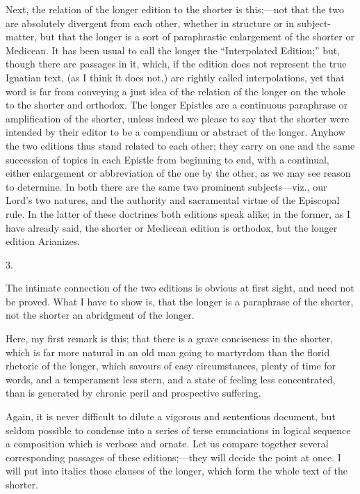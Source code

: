 Next, the relation of the
longer edition to the shorter is this;—not that the two are
absolutely divergent from each other, whether in structure or in
subject-matter, but that the longer is a sort of paraphrastic
enlargement of the shorter or Medicean. It has been usual to call the
longer the ``Interpolated Edition;'' but, though there are passages in
it, which, if the edition does not represent the true Ignatian text,
(as I think it does not,) are rightly called interpolations, yet that
word is far from conveying a just idea of the relation of the longer
on the whole to the shorter and orthodox. The longer Epistles
are a continuous paraphrase or amplification of the shorter, unless
indeed we please to say that the shorter were intended by their editor
to be a compendium or abstract of the longer. Anyhow the two editions
thus stand related to each other; they carry on one and the same
succession of topics in each Epistle from beginning to end, with a
continual, either enlargement or abbreviation of the one by the other,
as we may see reason to determine. In both there are the same two
prominent subjects—viz., our Lord's two natures, and the authority
and sacramental virtue of the Episcopal rule. In the latter of these
doctrines both editions speak alike; in the former, as I have already
said, the shorter or Medicean edition is orthodox, but the longer
edition Arianizes.

3.

The intimate connection of the
two editions is obvious at first sight, and need not be proved. What I
have to show is, that the longer is a paraphrase of the shorter, not
the shorter an abridgment of the longer.

Here, my first remark is this;
that there is a grave conciseness in the shorter, which is far more
natural in an old man going to martyrdom than the florid rhetoric of
the longer, which savours of easy circumstances, plenty of time for
words, and a temperament less stern, and a state of feeling less
concentrated, than is generated by chronic peril and prospective
suffering.

Again, it is never difficult
to dilute a vigorous and sententious document, but seldom possible to
condense into a series of terse enunciations in logical sequence
a composition which is verbose and ornate. Let us compare together
several corresponding passages of these editions;—they will decide
the point at once. I will put into italics those clauses of the
longer, which form the whole text of the shorter.

